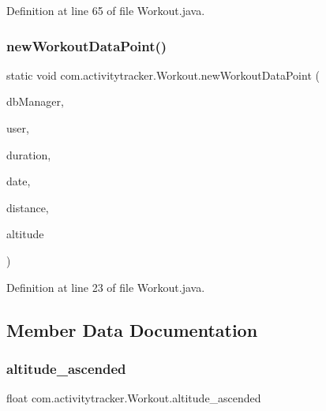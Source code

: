 Definition at line 65 of file Workout.\+java.

\mbox{\label{classcom_1_1activitytracker_1_1_workout_aa595f618a20c8e98bb96c221c5158e9a}} 
\subsubsection{\texorpdfstring{new\+Workout\+Data\+Point()}{newWorkoutDataPoint()}}
{\footnotesize\ttfamily static void com.\+activitytracker.\+Workout.\+new\+Workout\+Data\+Point (\begin{DoxyParamCaption}\item[{final \mbox{\hyperlink{classcom_1_1activitytracker_1_1_d_b_manager}{D\+B\+Manager}}}]{db\+Manager,  }\item[{final \mbox{\hyperlink{classcom_1_1activitytracker_1_1_user}{User}}}]{user,  }\item[{final float}]{duration,  }\item[{final Date}]{date,  }\item[{final float}]{distance,  }\item[{final float}]{altitude }\end{DoxyParamCaption})\hspace{0.3cm}{\ttfamily [static]}}



Definition at line 23 of file Workout.\+java.



\subsection{Member Data Documentation}
\mbox{\label{classcom_1_1activitytracker_1_1_workout_a7ab77a8e27a53469c6bbd1e1497e0dcd}} 
\subsubsection{\texorpdfstring{altitude\+\_\+ascended}{altitude\_ascended}}
{\footnotesize\ttfamily float com.\+activitytracker.\+Workout.\+altitude\+\_\+ascended\hspace{0.3cm}{\ttfamily [package]}}



